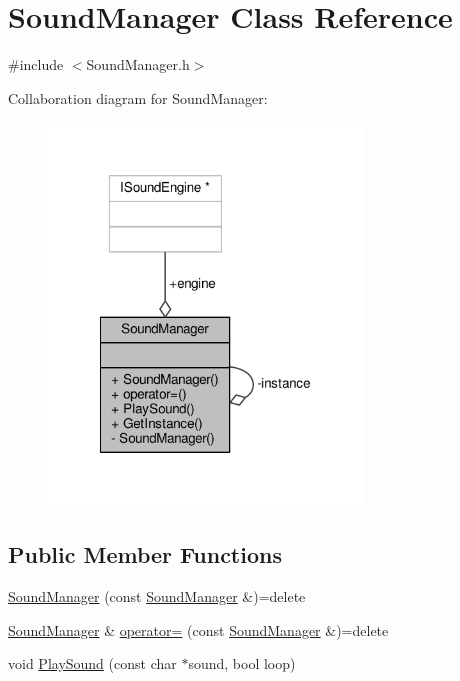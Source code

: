 \hypertarget{class_sound_manager}{\section{Sound\-Manager Class Reference}
\label{class_sound_manager}
}


{\ttfamily \#include $<$Sound\-Manager.\-h$>$}



Collaboration diagram for Sound\-Manager\-:
\nopagebreak
\begin{figure}[H]
\begin{center}
\leavevmode
\includegraphics[width=237pt]{class_sound_manager__coll__graph}
\end{center}
\end{figure}
\subsection*{Public Member Functions}
\begin{DoxyCompactItemize}
\item 
\hyperlink{class_sound_manager_aac4b48cfc4d394c547f5efec7d451165}{Sound\-Manager} (const \hyperlink{class_sound_manager}{Sound\-Manager} \&)=delete
\item 
\hyperlink{class_sound_manager}{Sound\-Manager} \& \hyperlink{class_sound_manager_ae5e6042f633424541acd84b144ac80af}{operator=} (const \hyperlink{class_sound_manager}{Sound\-Manager} \&)=delete
\item 
void \hyperlink{class_sound_manager_a81e8f88fe549f6767d3552f12c28ecbc}{Play\-Sound} (const char $\ast$sound, bool loop)
\end{DoxyCompactItemize}
